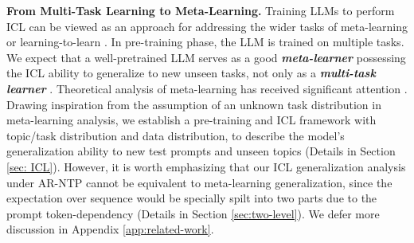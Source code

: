 \textbf{From Multi-Task Learning to Meta-Learning.} \quad Training LLMs to perform ICL can be viewed as an approach for addressing the wider tasks of meta-learning or learning-to-learn \citep{naik1992meta, schmidhuber1987evolutionary}. In pre-training phase, the LLM is trained on multiple tasks. We expect that a well-pretrained LLM serves as a good \textbf{\textit{meta-learner}} possessing the ICL ability to generalize to new unseen tasks, not only as a \textit{\textbf{multi-task learner}} \citep{radford2019language}. Theoretical analysis of meta-learning has received significant attention \citep{chua2021fine, denevi2018incremental, ji2020convergence,tripuraneni2020theory}. Drawing inspiration from the assumption of an unknown task distribution in meta-learning analysis, we establish a pre-training and ICL framework with topic/task distribution and data distribution, to describe the model's generalization ability to new test prompts and unseen topics (Details in Section \ref{sec: ICL}). However, it is worth emphasizing that our ICL generalization analysis under AR-NTP cannot be equivalent to meta-learning generalization, since the expectation over sequence would be specially spilt into two parts due to the prompt token-dependency (Details in Section \ref{sec:two-level}). We defer more discussion in Appendix \ref{app:related-work}.